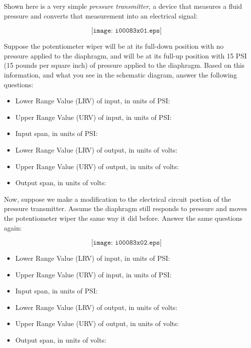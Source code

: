 

Shown here is a very simple {\it pressure transmitter}, a device that measures a fluid pressure and converts that measurement into an electrical signal:

$$\texttt{[image: i00083x01.eps]}$$

Suppose the potentiometer wiper will be at its full-down position with no pressure applied to the diaphragm, and will be at its full-up position with 15 PSI (15 pounds per square inch) of pressure applied to the diaphragm.  Based on this information, and what you see in the schematic diagram, answer the following questions:

\begin{itemize}
\item{} Lower Range Value (LRV) of input, in units of PSI:
\item{} Upper Range Value (URV) of input, in units of PSI:
\item{} Input span, in units of PSI:
\vskip 5pt
\item{} Lower Range Value (LRV) of output, in units of volts:
\item{} Upper Range Value (URV) of output, in units of volts:
\item{} Output span, in units of volts:
\end{itemize}

\goodbreak
Now, suppose we make a modification to the electrical circuit portion of the pressure transmitter.  Assume the diaphragm still responds to pressure and moves the potentiometer wiper the same way it did before.  Answer the same questions again:

$$\texttt{[image: i00083x02.eps]}$$

\begin{itemize}
\item{} Lower Range Value (LRV) of input, in units of PSI:
\item{} Upper Range Value (URV) of input, in units of PSI:
\item{} Input span, in units of PSI:
\vskip 5pt
\item{} Lower Range Value (LRV) of output, in units of volts:
\item{} Upper Range Value (URV) of output, in units of volts:
\item{} Output span, in units of volts:
\end{itemize}


